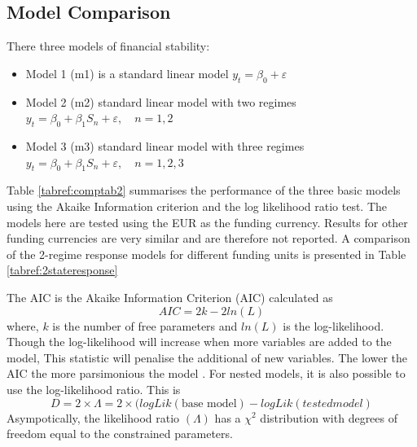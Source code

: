 \documentclass[12pt, a4paper, oneside]{article} %
\begin{document}
\subsection{Model Comparison}
There three models of financial stability: 
\begin{itemize}
\item Model 1 (m1) is a standard linear model $y_t = \beta_0  + \varepsilon$
\item Model 2 (m2) standard linear model with two regimes $y_t = \beta_0 + \beta_1 S_n + \varepsilon, \quad n = 1, 2$
\item Model 3 (m3) standard linear model with three regimes $y_t = \beta_0 + \beta_1 S_n + \varepsilon, \quad n = 1, 2, 3$
\end{itemize}

Table \ref{tabref:comptab2} summarises the performance of the three basic models using the Akaike Information criterion and the log likelihood ratio test.  The models here are tested using the EUR as the funding currency.  Results for other funding currencies are very similar and are therefore not reported.  A comparison of the 2-regime response models for different funding units is presented in Table \ref{tabref:2stateresponse} 

The AIC is the Akaike Information Criterion (AIC) calculated as 
\begin{equation}
AIC = 2k - 2ln(L) 
\end{equation}
where, $k$ is the number of free parameters and $ln(L)$ is the log-likelihood.  Though the log-likelihood will increase when more variables are added to the model, This statistic will penalise the additional of new variables.  The lower the AIC the more parsimonious the model \citet{AIC}. For nested models, it is also possible to use the log-likelihood ratio.  This is 
\begin{equation}
D = 2 \times \Lambda = 2 \times (logLik(\text{base model}) - logLik({tested model})
\end{equation}
Asympotically, the likelihood ratio $(\Lambda)$ has a $\chi^2$ distribution with degrees of freedom equal to the constrained parameters. 
\end{document}
